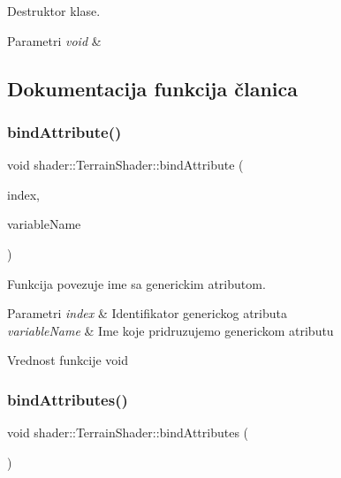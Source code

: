 Destruktor klase. 


\begin{DoxyParams}{Parametri}
{\em void} & \\
\hline
\end{DoxyParams}


\subsection{Dokumentacija funkcija članica}
\mbox{\label{classshader_1_1TerrainShader_ae414b98f36de2a58d9c7f18ae6b9880a}} 
\subsubsection{\texorpdfstring{bind\+Attribute()}{bindAttribute()}}
{\footnotesize\ttfamily void shader\+::\+Terrain\+Shader\+::bind\+Attribute (\begin{DoxyParamCaption}\item[{int}]{index,  }\item[{const char $\ast$}]{variable\+Name }\end{DoxyParamCaption})}



Funkcija povezuje ime sa generickim atributom. 


\begin{DoxyParams}{Parametri}
{\em index} & Identifikator generickog atributa \\
\hline
{\em variable\+Name} & Ime koje pridruzujemo generickom atributu \\
\hline
\end{DoxyParams}
\begin{DoxyReturn}{Vrednost funkcije}
void 
\end{DoxyReturn}
\mbox{\label{classshader_1_1TerrainShader_afca63864591afe38d57ff8ae39aa8911}} 
\subsubsection{\texorpdfstring{bind\+Attributes()}{bindAttributes()}}
{\footnotesize\ttfamily void shader\+::\+Terrain\+Shader\+::bind\+Attributes (\begin{DoxyParamCaption}\item[{void}]{ }\end{DoxyParamCaption})}



